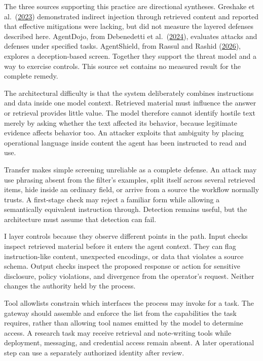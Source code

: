 The three sources supporting this practice are directional syntheses. Greshake et al.~(\href{https://arxiv.org/abs/2302.12173}{2023}) demonstrated indirect injection through retrieved content and reported that effective mitigations were lacking, but did not measure the layered defenses described here. AgentDojo, from Debenedetti et al.~(\href{https://arxiv.org/abs/2406.13352}{2024}), evaluates attacks and defenses under specified tasks. AgentShield, from Rassul and Rashid (\href{https://arxiv.org/abs/2605.11026}{2026}), explores a deception-based screen. Together they support the threat model and a way to exercise controls. This source set contains no measured result for the complete remedy.

The architectural difficulty is that the system deliberately combines instructions and data inside one model context. Retrieved material must influence the answer or retrieval provides little value. The model therefore cannot identify hostile text merely by asking whether the text affected its behavior, because legitimate evidence affects behavior too. An attacker exploits that ambiguity by placing operational language inside content the agent has been instructed to read and use.

Transfer makes simple screening unreliable as a complete defense. An attack may use phrasing absent from the filter's examples, split itself across several retrieved items, hide inside an ordinary field, or arrive from a source the workflow normally trusts. A first-stage check may reject a familiar form while allowing a semantically equivalent instruction through. Detection remains useful, but the architecture must assume that detection can fail.

I layer controls because they observe different points in the path. Input checks inspect retrieved material before it enters the agent context. They can flag instruction-like content, unexpected encodings, or data that violates a source schema. Output checks inspect the proposed response or action for sensitive disclosure, policy violations, and divergence from the operator's request. Neither changes the authority held by the process.

Tool allowlists constrain which interfaces the process may invoke for a task. The gateway should assemble and enforce the list from the capabilities the task requires, rather than allowing tool names emitted by the model to determine access. A research task may receive retrieval and note-writing tools while deployment, messaging, and credential access remain absent. A later operational step can use a separately authorized identity after review.

